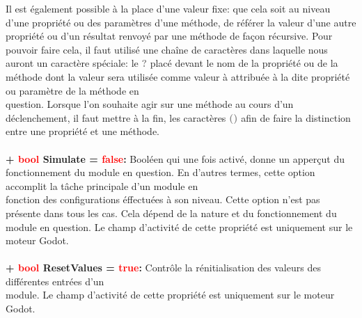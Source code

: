 \documentclass[a4paper, 11pt]{article}
\begin{document}
	Il est également possible à la place d'une valeur fixe: que cela soit au niveau d'une propriété ou des
	paramètres d'une méthode, de référer la valeur d'une autre propriété ou d'un résultat renvoyé par une
	méthode de façon récursive. Pour pouvoir faire cela, il faut utilisé une chaîne de caractères dans 
	laquelle nous auront un caractère spéciale: le \textcolor{gray}{\textbf{?}} placé devant le nom de la 
	propriété ou de la méthode dont la valeur sera utilisée comme valeur à attribuée à la dite propriété ou 
	paramètre de la méthode en \\question. Lorsque l'on souhaite agir sur une méthode au cours d'un 
	déclenchement, il faut mettre à la fin, les caractères \textcolor{gray}{\textbf{()}} afin de faire la 
	distinction entre une propriété et une méthode.\\\\
	\textbf{+ \textcolor{red}{bool} Simulate = \textcolor{red}{false}:} Booléen qui une fois activé, donne 
	un apperçut du fonctionnement du module en question. En d'autres termes, cette option accomplit la tâche 
	principale d'un module en \\fonction des configurations éffectuées à son niveau. Cette option n'est pas 
	présente dans tous les cas. Cela dépend de la nature et du fonctionnement du module en question. Le
	champ d'activité de cette propriété est uniquement sur le moteur Godot.\\\\
	\textbf{+ \textcolor{red}{bool} ResetValues = \textcolor{red}{true}:} Contrôle la rénitialisation des 
	valeurs des différentes entrées d'un \\module. Le champ d'activité de cette propriété est uniquement sur
	le moteur Godot.

\end{document}
